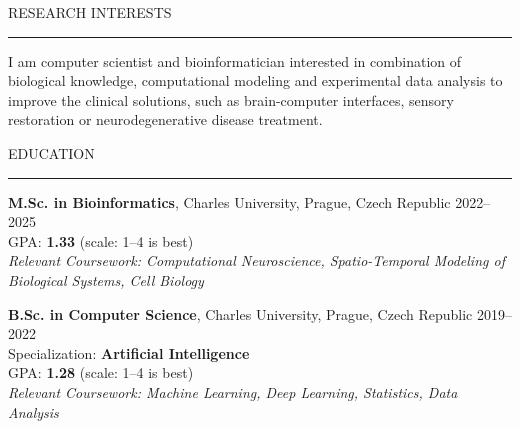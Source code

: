 \documentclass{resume} %
\renewenvironment{rSection}[1]{
\sectionskip
\textcolor{CarnegieMellonRed}{\MakeUppercase{#1}}
\sectionlineskip
\hrule
\begin{list}{}{
\setlength{\leftmargin}{1.5em}
}
\item[]
}{
\end{list}
}
\begin{document}
\begin{rSection}{Research Interests}
    I am computer scientist and bioinformatician interested in combination of biological knowledge, computational modeling and experimental data analysis to improve the clinical solutions, such as brain-computer interfaces, sensory restoration or neurodegenerative disease treatment.
\end{rSection}

\begin{rSection}{Education}

{\bf \large M.Sc. in Bioinformatics}, Charles University, Prague, Czech Republic \hfill {2022--2025} \\ 
GPA: \textbf{1.33} (scale: 1--4 \vline {} is best) \\
{\em Relevant Coursework: Computational Neuroscience, Spatio-Temporal Modeling of Biological Systems, Cell Biology}

{\bf \large B.Sc. in Computer Science}, Charles University, Prague, Czech Republic \hfill {2019--2022} \\
Specialization: \textbf{Artificial Intelligence} \\
GPA: \textbf{1.28} (scale: 1--4 \vline {} is best) \\
{\em Relevant Coursework: Machine Learning, Deep Learning, Statistics, Data Analysis}

\end{rSection}
\end{document}

